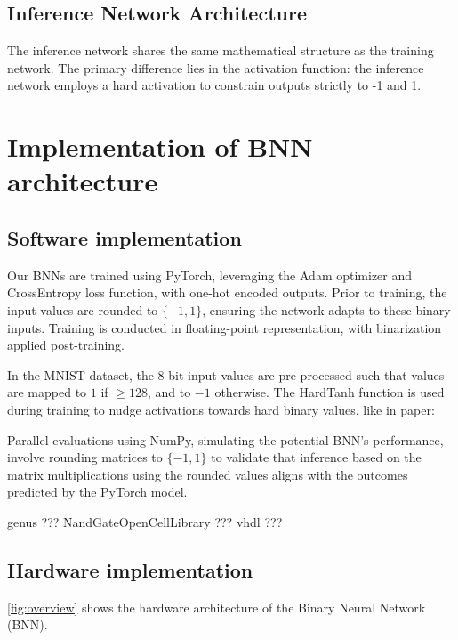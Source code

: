 \documentclass[conference]{IEEEtran}
\newcounter{todocount}
\newcommand{\todo}[1]{
  \stepcounter{todocount}
}
\begin{document}
\subsection{Inference Network Architecture}
\label{subsec:inference_network_architecture}
The inference network shares the same mathematical structure as the training network. The primary difference lies in the activation function: the inference network employs a hard activation to constrain outputs strictly to -1 and 1.



\section{Implementation of BNN architecture}
\label{sec:implementation}
\subsection{Software implementation}
\todo{list learning rate, batch size}

Our BNNs are trained using PyTorch\cite{paszke2019pytorch}, leveraging the Adam optimizer\cite{kingma2014adam} and CrossEntropy loss function\cite{mao2023crossentropy}, with one-hot encoded outputs. Prior to training, the input values are rounded to \(\{-1, 1\}\), ensuring the network adapts to these binary inputs. Training is conducted in floating-point representation, with binarization applied post-training.

In the MNIST dataset, the 8-bit input values are pre-processed such that values are mapped to $1$ if $\geq 128$, and to $-1$ otherwise. The HardTanh function is used during training to nudge activations towards hard binary values. like in paper: \cite{yuan2023comprehensive}

Parallel evaluations using NumPy, simulating the potential BNN's performance, involve rounding matrices to \(\{-1, 1\}\) to validate that inference based on the matrix multiplications using the rounded values aligns with the outcomes predicted by the PyTorch model.


genus ??? NandGateOpenCellLibrary ??? \cite{nangate_lib} vhdl ???



\subsection{Hardware implementation}

\autoref{fig:overview} shows the hardware architecture of the Binary Neural Network (BNN). 
\end{document}
